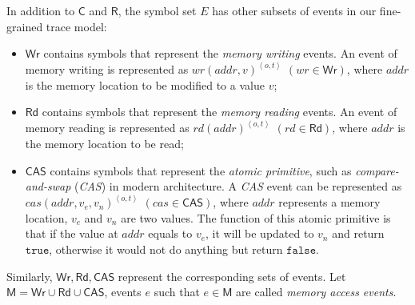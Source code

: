 \documentclass[runningheads]{llncs}
\newcommand{\ecall}{\mathsf{C}}
\newcommand{\eresp}{\mathsf{R}}
\newcommand{\ewrite}{\mathsf{Wr}}
\newcommand{\eread}{\mathsf{Rd}}
\newcommand{\ecas}{\mathsf{CAS}}
\begin{document}
In addition to $\ecall$ and $\eresp$, the symbol set $E$ has other subsets of events in our fine-grained trace model:

\begin{itemize}
  \item $\ewrite$ contains symbols that represent the \textit{memory writing} events. An event of memory writing is represented as $wr(addr,v)^{\left\langle o,t\right\rangle}$ $(wr \in \ewrite)$, where $addr$ is the memory location to be modified to a value $v$;
  \item $\eread$ contains symbols that represent the \textit{memory reading} events. An event of memory reading is represented as $rd(addr)^{\left\langle o,t\right\rangle}$ $(rd \in \eread)$, where $addr$ is the memory location to be read;
  \item $\ecas$ contains symbols that represent the \textit{atomic primitive}, such as \textit{compare-and-swap} (\textit{CAS}) in modern architecture. A \textit{CAS} event can be represented as $cas(addr, v_e, v_n)^{\left\langle o,t\right\rangle}$ $(cas \in \ecas)$, where $addr$ represents a memory location, $v_e$ and $v_n$ are two values. The function of this atomic primitive is that if the value at $addr$ equals to $v_e$, it will be updated to $v_n$ and return $\mathtt{true}$, otherwise it would not do anything but return $\mathtt{false}$.
\end{itemize}
\noindent Similarly, $\ewrite, \eread, \ecas$ represent the corresponding sets of events. Let $\mathsf{M} = \ewrite\cup\eread\cup\ecas$, events $e$ such that $e\in \mathsf{M}$ are called \textit{memory access events}.
\end{document}
